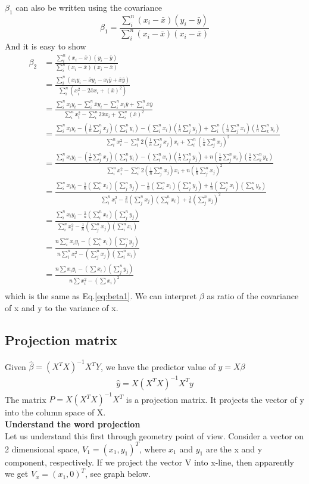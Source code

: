 \documentclass[a4paper]{article}
\begin{document}
$\beta_1$ can also be written using the covariance
\begin{equation} \label{eq:betacovariance}
\beta_1=\frac{\sum_i^n(x_i-\bar x)(y_i-\bar y)}{\sum_i^n(x_i-\bar x)(x_i-\bar x)}
\end{equation}
And it is easy to show 
\begin{align*}
\beta_2 &=\frac{\sum_i^n(x_i-\bar x)(y_i-\bar y)}{\sum_i^n(x_i-\bar x)(x_i-\bar x)}\\
            &=\frac{\sum_i^n(x_iy_i-\bar x y_i -x_i \bar y + \bar x \bar y)}{\sum_i^n(x_i^2 -2\bar x x_i + (\bar x)^2)}\\
	    &=\frac{\sum_i^n x_iy_i-\sum_i^n \bar x y_i -\sum_i^n x_i \bar y + \sum_i^n \bar x \bar y}{\sum_i^n x_i^2 -\sum_i^n 2\bar x x_i + \sum_i^n (\bar x)^2}\\
           &=\frac{\sum_i^n x_iy_i-(\frac{1}{n}\sum_j^n x_j)(\sum_i^n y_i) -(\sum_i^n x_i)(\frac{1}{n}\sum_j^n y_j) + \sum_i^n (\frac{1}{n}\sum_j^n x_i)(\frac{1}{n}\sum_k^n y_i)}{\sum_i^n x_i^2 -\sum_i^n 2(\frac{1}{n}\sum_j^n x_j) x_i + \sum_i^n (\frac{1}{n}\sum_j^n x_j)^2}\\
 &=\frac{\sum_i^n x_iy_i-(\frac{1}{n}\sum_j^n x_j)(\sum_i^n y_i) -(\sum_i^n x_i)(\frac{1}{n}\sum_j^n y_j) + n (\frac{1}{n}\sum_j^n x_i)(\frac{1}{n}\sum_k^n y_k)}{\sum_i^n x_i^2 -\sum_i^n 2(\frac{1}{n}\sum_j^n x_j) x_i + n(\frac{1}{n}\sum_j^n x_j)^2}\\
&=\frac{\sum_i^n x_iy_i-\frac{1}{n}(\sum_i^n x_i)(\sum_j^n y_j) -\frac{1}{n}(\sum_i^n x_i)(\sum_j^n y_j) +  \frac{1}{n}(\sum_j^n x_i)(\sum_k^n y_k)}{\sum_i^n x_i^2 - \frac{2}{n}(\sum_j^n x_j) (\sum_i^nx_i) + \frac{1}{n}(\sum_j^n x_j)^2}\\
&=\frac{\sum_i^n x_iy_i-\frac{1}{n}(\sum_i^n x_i)(\sum_j^n y_j)}{\sum_i^n x_i^2 - \frac{1}{n}(\sum_j^n x_j) (\sum_i^nx_i) }\\
&=\frac{n\sum_i^n x_iy_i-(\sum_i^n x_i)(\sum_j^n y_j)}{n\sum_i^n x_i^2 - (\sum_j^n x_j) (\sum_i^nx_i) }\\
&=\frac{n\sum x_iy_i-(\sum x_i)(\sum_j^n y_j)}{n\sum x_i^2 - (\sum x_i)^2 }\\
\end{align*}
which is the same as Eq.\ref{eq:beta1}.  We can interpret $\beta$ as ratio of the covariance of x and y to the variance of x.
\subsection{Projection matrix}
Given $\hat \beta = (X^TX)^{-1}X^TY$, we have the predictor value of $y=X\beta$ 
\begin{align*}
\hat y = X(X^TX)^{-1}X^T y
\end{align*}
The matrix $P=X(X^TX)^{-1}X^T$ is a projection matrix. It projects the vector of y into the column space of X.\\
{\bf Understand the word projection}\\
Let us understand this first through geometry point of view. Consider a vector on 2 dimensional space, $V_1= (x_1, y_1)^T$, where $x_1$ and $y_1$ are the x and y component, respectively. If we project the vector V into x-line, then apparently we get $V_x= (x_1, 0)^T$, see graph below.
\end{document}
